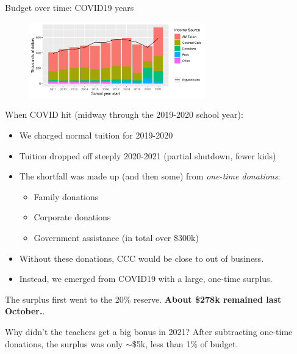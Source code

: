 \documentclass[8pt]{beamer}
\begin{document}
\begin{frame}{Budget over time: COVID19 years}
\begin{figure}
\begin{center}
\includegraphics[width=3in]{budget_history_w_income_source.png}
\end{center}
\end{figure}

When COVID hit (midway through the 2019-2020 school year):
%
\begin{itemize}
%
\item We charged normal tuition for 2019-2020
\item Tuition dropped off steeply 2020-2021 (partial shutdown, fewer kids)
\item The shortfall was made up (and then some) from {\em one-time donations}:
\begin{itemize}
    \item Family donations
    \item Corporate donations
    \item Government assistance (in total over \$300k)
\end{itemize}
\item Without these donations, CCC would be close to out of business.
\item Instead, we emerged from COVID19 with a large, one-time surplus.
%
\end{itemize}
%
\pause
The surplus first went to the 20\% reserve.
\textbf{About \$278k remained last October.}.

Why didn't the teachers get a big bonus in 2021?  After subtracting one-time
donations, the surplus was only $\sim$\$5k, less than 1\% of budget.

\end{frame}


\end{document}
